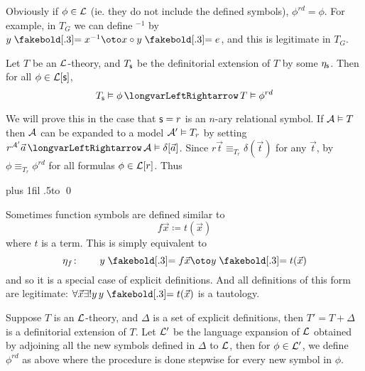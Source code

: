 \edefn

Obviously if $\phi\in{\cal L}$ (ie. they do not include the defined symbols), $\phi^{rd}=\phi$.
For example, in $T_G$ we can define ${}^{-1}$ by $y\eq x^{-1}\oto x\circ y\eq e$, and this is legitimate in $T_G$.

\bthrm[title=The Elimination Theorem, name=eliminationtheorem]

    Let $T$ be an ${\cal L}$-theory, and $T_{\sf s}$ be the definitorial extension of $T$ by some $\eta_{\sf s}$.
    Then for all $\phi\in{\cal L}[{\sf s}]$,
    $$ T_{\sf s}\vDash\phi \iff T\vDash\phi^{rd} $$

\ethrm

We will prove this in the case that ${\sf s}=r$ is an $n$-ary relational symbol.
If ${\cal A}\vDash T$ then ${\cal A}$ can be expanded to a model ${\cal A}'\vDash T_r$ by setting $r^{\cal A'}\vec a\iff{\cal A}\vDash\delta[\vec a]$.
Since $r\vec t\equiv_{T_r}\delta(\vec t)$ for any $\vec t$, by  $\phi\equiv_{T_r}\phi^{rd}$ for all formulas $\phi\in{\cal L}[r]$.
Thus

\medskip
\tabskip=0pt plus 1fil
{\openup.5\jot\halign to}
\qed

Sometimes function symbols are defined similar to
$$ f\vec x \coloneqq t(\vec x) $$
where $t$ is a term.
This is simply equivalent to
$$ \eta_f\colon\qquad y\eq f\vec x\oto y\eq t(\vec x) $$
and so it is a special case of explicit definitions.
And all definitions of this form are legitimate: $\forall\vec x\exists! y\,y\eq t(\vec x)$ is a tautology.

\bdefn

    Suppose $T$ is an ${\cal L}$-theory, and $\Delta$ is a set of explicit definitions, then $T'=T+\Delta$ is a {\emphcolor definitorial extension} of $T$.
    Let ${\cal L}'$ be the language expansion of ${\cal L}$ obtained by adjoining all the new symbols defined in $\Delta$ to ${\cal L}$, then for $\phi\in{\cal L}'$, we define $\phi^{rd}$ as above where
    the procedure is done stepwise for every new symbol in $\phi$.

